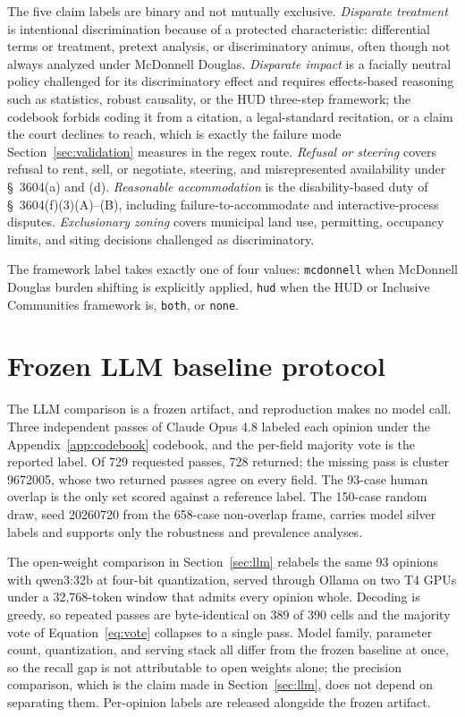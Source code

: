 \documentclass[11pt]{article}
\begin{document}
The five claim labels are binary and not mutually exclusive. \emph{Disparate treatment} is intentional discrimination because of a protected characteristic: differential terms or treatment, pretext analysis, or discriminatory animus, often though not always analyzed under McDonnell Douglas. \emph{Disparate impact} is a facially neutral policy challenged for its discriminatory effect and requires effects-based reasoning such as statistics, robust causality, or the HUD three-step framework; the codebook forbids coding it from a citation, a legal-standard recitation, or a claim the court declines to reach, which is exactly the failure mode Section~\ref{sec:validation} measures in the regex route. \emph{Refusal or steering} covers refusal to rent, sell, or negotiate, steering, and misrepresented availability under \S~3604(a) and (d). \emph{Reasonable accommodation} is the disability-based duty of \S~3604(f)(3)(A)--(B), including failure-to-accommodate and interactive-process disputes. \emph{Exclusionary zoning} covers municipal land use, permitting, occupancy limits, and siting decisions challenged as discriminatory.

The framework label takes exactly one of four values: \texttt{mcdonnell} when McDonnell Douglas burden shifting is explicitly applied, \texttt{hud} when the HUD or Inclusive Communities framework is, \texttt{both}, or \texttt{none}.

\section{Frozen LLM baseline protocol}\label{app:llmprotocol}

The LLM comparison is a frozen artifact, and reproduction makes no model call. Three independent passes of Claude Opus 4.8 labeled each opinion under the Appendix~\ref{app:codebook} codebook, and the per-field majority vote is the reported label. Of 729 requested passes, 728 returned; the missing pass is cluster 9672005, whose two returned passes agree on every field. The 93-case human overlap is the only set scored against a reference label. The 150-case random draw, seed 20260720 from the 658-case non-overlap frame, carries model silver labels and supports only the robustness and prevalence analyses.

The open-weight comparison in Section~\ref{sec:llm} relabels the same 93 opinions with qwen3:32b at four-bit quantization, served through Ollama on two T4 GPUs under a 32{,}768-token window that admits every opinion whole. Decoding is greedy, so repeated passes are byte-identical on 389 of 390 cells and the majority vote of Equation~\ref{eq:vote} collapses to a single pass. Model family, parameter count, quantization, and serving stack all differ from the frozen baseline at once, so the recall gap is not attributable to open weights alone; the precision comparison, which is the claim made in Section~\ref{sec:llm}, does not depend on separating them. Per-opinion labels are released alongside the frozen artifact.
\end{document}
